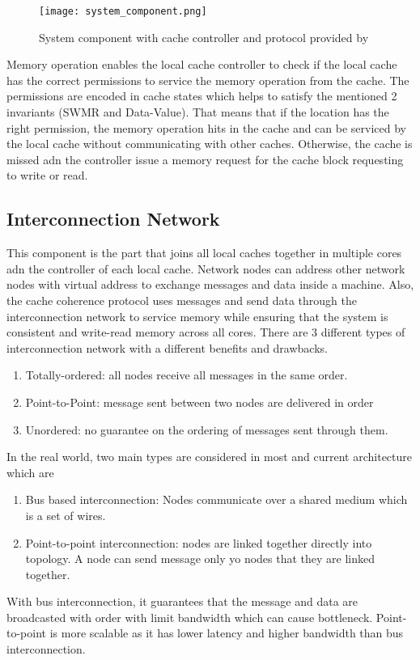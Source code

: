 \begin{figure}[h]
        \centering
        \texttt{[image: system\_component.png]}
        \caption{\label{fig:system_component} System component with cache controller and protocol provided by \citealp{hay2012mesif}}
\end{figure}
\newpage
Memory operation enables the local cache controller to check if the local cache has the correct permissions to service the memory operation from the cache. The permissions are encoded in cache states which helps to
satisfy the mentioned 2 invariants (SWMR and Data-Value). That means that if the location has the right permission, the memory operation hits in the cache and 
can be serviced by the local cache without communicating with other caches. Otherwise, the cache is missed adn the controller issue a memory request for the cache block requesting to write or read.

\subsection{Interconnection Network}
This component is the part that joins all local caches together in multiple cores adn the controller of each local cache. Network nodes can address other network nodes with virtual address to exchange messages and data inside a machine.
Also, the cache coherence protocol uses messages and send data through the interconnection network to service memory while ensuring that the system is consistent and write-read memory across all cores.
There are 3 different types of interconnection network with a different benefits and drawbacks.
\begin{enumerate}
        \item Totally-ordered: all nodes receive all messages in the same order.
        \item Point-to-Point: message sent between two nodes are delivered in order
        \item Unordered: no guarantee on the ordering of messages sent through them.
\end{enumerate}
In the real world, two main types are considered in most and current architecture which are
\begin{enumerate}
        \item Bus based interconnection: Nodes communicate over a shared medium which is a set of wires.
        \item Point-to-point interconnection: nodes are linked together directly into topology. A node can send message
                only yo nodes that they are linked together.
\end{enumerate}
With bus interconnection, it guarantees that the message and data are broadcasted with order with limit bandwidth which can cause bottleneck.
Point-to-point is more scalable as it has lower latency and higher bandwidth than bus interconnection.

